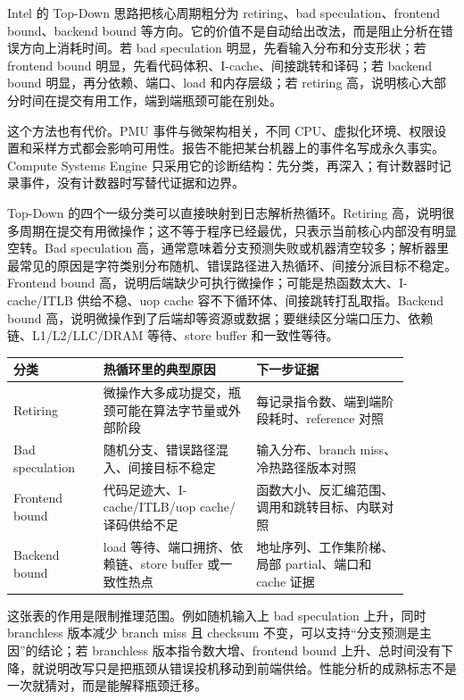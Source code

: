 Intel 的 Top-Down 思路把核心周期粗分为 retiring、bad speculation、frontend bound、backend bound 等方向。它的价值不是自动给出改法，而是阻止分析在错误方向上消耗时间。若 bad speculation 明显，先看输入分布和分支形状；若 frontend bound 明显，先看代码体积、I-cache、间接跳转和译码；若 backend bound 明显，再分依赖、端口、load 和内存层级；若 retiring 高，说明核心大部分时间在提交有用工作，端到端瓶颈可能在别处。

这个方法也有代价。PMU 事件与微架构相关，不同 CPU、虚拟化环境、权限设置和采样方式都会影响可用性。报告不能把某台机器上的事件名写成永久事实。Compute Systems Engine 只采用它的诊断结构：先分类，再深入；有计数器时记录事件，没有计数器时写替代证据和边界。

Top-Down 的四个一级分类可以直接映射到日志解析热循环。Retiring 高，说明很多周期在提交有用微操作；这不等于程序已经最优，只表示当前核心内部没有明显空转。Bad speculation 高，通常意味着分支预测失败或机器清空较多；解析器里最常见的原因是字符类别分布随机、错误路径进入热循环、间接分派目标不稳定。Frontend bound 高，说明后端缺少可执行微操作；可能是热函数太大、I-cache/ITLB 供给不稳、uop cache 容不下循环体、间接跳转打乱取指。Backend bound 高，说明微操作到了后端却等资源或数据；要继续区分端口压力、依赖链、L1/L2/LLC/DRAM 等待、store buffer 和一致性等待。

\begin{center}
\small
\begin{tabular}{@{}p{0.20\linewidth}p{0.34\linewidth}p{0.34\linewidth}@{}}
\toprule
分类 & 热循环里的典型原因 & 下一步证据 \\
\midrule
Retiring & 微操作大多成功提交，瓶颈可能在算法字节量或外部阶段 & 每记录指令数、端到端阶段耗时、reference 对照 \\
Bad speculation & 随机分支、错误路径混入、间接目标不稳定 & 输入分布、branch miss、冷热路径版本对照 \\
Frontend bound & 代码足迹大、I-cache/ITLB/uop cache/译码供给不足 & 函数大小、反汇编范围、调用和跳转目标、内联对照 \\
Backend bound & load 等待、端口拥挤、依赖链、store buffer 或一致性热点 & 地址序列、工作集阶梯、局部 partial、端口和 cache 证据 \\
\bottomrule
\end{tabular}
\end{center}

这张表的作用是限制推理范围。例如随机输入上 bad speculation 上升，同时 branchless 版本减少 branch miss 且 checksum 不变，可以支持“分支预测是主因”的结论；若 branchless 版本指令数大增、frontend bound 上升、总时间没有下降，就说明改写只是把瓶颈从错误投机移动到前端供给。性能分析的成熟标志不是一次就猜对，而是能解释瓶颈迁移。

